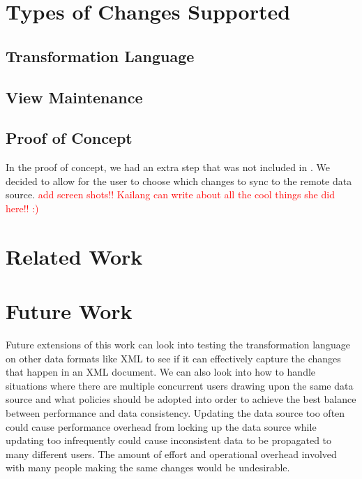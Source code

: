 \documentclass[12pt]{article}
\begin{document}
\noindent

\section{Types of Changes Supported}
\subsection{Transformation Language}
\subsection{View Maintenance}
\subsection{Proof of Concept}
In the proof of concept, we had an extra step that was not included in \cite{arniThesis}. We decided to allow for the user to choose which changes to sync to the remote data source. \textcolor{red}{add screen shots!! Kailang can write about all the cool things she did here!! :)}



\section{Related Work}

\section{Future Work}
Future extensions of this work can look into testing the transformation language on other data formats like XML to see if it can effectively capture the changes that happen in an XML document. We can also look into how to handle situations where there are multiple concurrent users drawing upon the same data source and what policies should be adopted into order to achieve the best balance between performance and data consistency. Updating the data source too often could cause performance overhead from locking up the data source while updating too infrequently could cause inconsistent data to be propagated to many different users. The amount of effort and operational overhead involved with many people making the same changes would be undesirable. 
\end{document}
